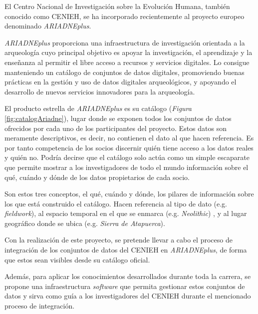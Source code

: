 
El Centro Nacional de Investigación sobre la Evolución Humana, también
conocido como CENIEH, se ha incorporado recientemente al proyecto
europeo denominado \emph{ARIADNEplus}. 

\emph{ARIADNEplus} proporciona una infraestructura de investigación orientada a la arqueología cuyo
principal objetivo es apoyar la investigación, el aprendizaje y la
enseñanza al permitir el libre acceso a recursos y servicios digitales.
Lo consigue manteniendo un catálogo de conjuntos de datos digitales, 
promoviendo buenas prácticas en la gestión y uso de datos digitales 
arqueológicos, y apoyando el desarrollo de nuevos servicios innovadores para la arqueología.


El producto estrella de \emph{ARIADNEplus} es su catálogo (\emph{Figura} \ref{fig:catalogAriadne}), lugar donde se exponen
todos los conjuntos de datos ofrecidos por cada uno de los participantes del proyecto.
Estos datos son meramente descriptivos, es decir, no contienen el dato al que hacen
referencia. Es por tanto competencia de los socios discernir quién tiene
acceso a los datos reales y quién no. Podría decirse que el catálogo
solo actúa como un simple escaparate que permite mostrar a los
investigadores de todo el mundo información sobre el qué, cuándo y dónde
de los datos propietarios de cada socio.


Son estos tres conceptos, el qué, cuándo y dónde, los pilares de
información sobre los que está construido el catálogo. Hacen referencia
al tipo de dato (e.g. \emph{fieldwork}), al espacio temporal en el que
se enmarca (e.g. \emph{Neolithic}) , y al lugar geográfico donde se
ubica (e.g. \emph{Sierra de Atapuerca}).

Con la realización de este proyecto, se pretende llevar a cabo el proceso
de integración de los conjuntos de datos del CENIEH en
\emph{ARIADNEplus}, de forma que estos sean visibles desde su catálogo
oficial.

Además, para aplicar los conocimientos desarrollados durante toda la
carrera, se propone una infraestructura \emph{software} que permita
gestionar estos conjuntos de datos y sirva como guía a los
investigadores del CENIEH durante el mencionado proceso de integración.


